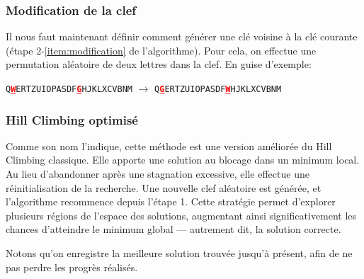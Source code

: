 \documentclass[a4paper]{article}
\newcommand{\highlight}[1]{\textbf{\textcolor{red}{\underline{#1}}}}
\begin{document}
\subsubsection*{Modification de la clef}\label{sec:modification_de_la_clef}

Il nous faut maintenant définir comment générer une clé voisine à la clé courante (étape 2-\ref{item:modification} de l’algorithme).  
Pour cela, on effectue une permutation aléatoire de deux lettres dans la clef. En guise d'exemple:

\begin{center}
\texttt{Q\highlight{W}ERTZUIOPASDF\highlight{G}HJKLXCVBNM} $\rightarrow$ \texttt{Q\highlight{G}ERTZUIOPASDF\highlight{W}HJKLXCVBNM}
\end{center}


\subsubsection{Hill Climbing optimisé}

Comme son nom l’indique, cette méthode est une version améliorée du Hill Climbing classique. Elle apporte une solution au blocage dans un minimum local.
Au lieu d’abandonner après une stagnation excessive, elle effectue une réinitialisation de la recherche. Une nouvelle clef aléatoire est générée, et l’algorithme recommence depuis l’étape 1.
Cette stratégie permet d’explorer plusieurs régions de l’espace des solutions, augmentant ainsi significativement les chances d’atteindre le minimum global — autrement dit, la solution correcte.

Notons qu'on enregistre la meilleure solution trouvée jusqu'à présent, afin de ne pas perdre les progrès réalisés.
\end{document}
